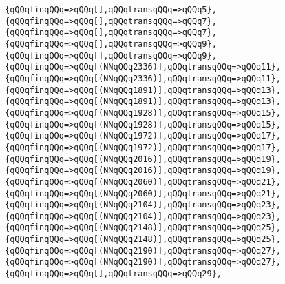 \verb|{qQQqfinqQQq=>qQQq[],qQQqtransqQQq=>qQQq5},|\newline
\verb|{qQQqfinqQQq=>qQQq[],qQQqtransqQQq=>qQQq7},|\newline
\verb|{qQQqfinqQQq=>qQQq[],qQQqtransqQQq=>qQQq7},|\newline
\verb|{qQQqfinqQQq=>qQQq[],qQQqtransqQQq=>qQQq9},|\newline
\verb|{qQQqfinqQQq=>qQQq[],qQQqtransqQQq=>qQQq9},|\newline
\verb|{qQQqfinqQQq=>qQQq[(NNqQQq2336)],qQQqtransqQQq=>qQQq11},|\newline
\verb|{qQQqfinqQQq=>qQQq[(NNqQQq2336)],qQQqtransqQQq=>qQQq11},|\newline
\verb|{qQQqfinqQQq=>qQQq[(NNqQQq1891)],qQQqtransqQQq=>qQQq13},|\newline
\verb|{qQQqfinqQQq=>qQQq[(NNqQQq1891)],qQQqtransqQQq=>qQQq13},|\newline
\verb|{qQQqfinqQQq=>qQQq[(NNqQQq1928)],qQQqtransqQQq=>qQQq15},|\newline
\verb|{qQQqfinqQQq=>qQQq[(NNqQQq1928)],qQQqtransqQQq=>qQQq15},|\newline
\verb|{qQQqfinqQQq=>qQQq[(NNqQQq1972)],qQQqtransqQQq=>qQQq17},|\newline
\verb|{qQQqfinqQQq=>qQQq[(NNqQQq1972)],qQQqtransqQQq=>qQQq17},|\newline
\verb|{qQQqfinqQQq=>qQQq[(NNqQQq2016)],qQQqtransqQQq=>qQQq19},|\newline
\verb|{qQQqfinqQQq=>qQQq[(NNqQQq2016)],qQQqtransqQQq=>qQQq19},|\newline
\verb|{qQQqfinqQQq=>qQQq[(NNqQQq2060)],qQQqtransqQQq=>qQQq21},|\newline
\verb|{qQQqfinqQQq=>qQQq[(NNqQQq2060)],qQQqtransqQQq=>qQQq21},|\newline
\verb|{qQQqfinqQQq=>qQQq[(NNqQQq2104)],qQQqtransqQQq=>qQQq23},|\newline
\verb|{qQQqfinqQQq=>qQQq[(NNqQQq2104)],qQQqtransqQQq=>qQQq23},|\newline
\verb|{qQQqfinqQQq=>qQQq[(NNqQQq2148)],qQQqtransqQQq=>qQQq25},|\newline
\verb|{qQQqfinqQQq=>qQQq[(NNqQQq2148)],qQQqtransqQQq=>qQQq25},|\newline
\verb|{qQQqfinqQQq=>qQQq[(NNqQQq2190)],qQQqtransqQQq=>qQQq27},|\newline
\verb|{qQQqfinqQQq=>qQQq[(NNqQQq2190)],qQQqtransqQQq=>qQQq27},|\newline
\verb|{qQQqfinqQQq=>qQQq[],qQQqtransqQQq=>qQQq29},|\newline
